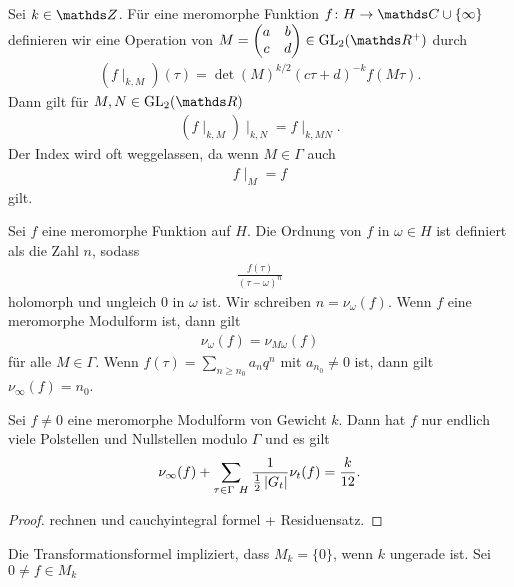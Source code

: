 \begin{defi}
Sei $k\in \Z$.
Für eine meromorphe Funktion $f \colon H \to \C \cup \{\infty\}$
definieren wir eine Operation von $M=\begin{pmatrix}
a&b\\
c&d
\end{pmatrix} \in \GL_2(\R^+)$
durch
\begin{align*}
(f\mid_{k,M})(\tau)=\det(M)^{k/2}(c\tau +d)^{-k} f(M\tau).
\end{align*}
Dann gilt für $M,N \in \GL_2(\R)$
\begin{align*}
(f\mid_{k,M})\mid_{k,N} =f \mid_{k,MN}.
\end{align*}
Der Index wird oft weggelassen, da wenn $M \in \Gamma$ auch
\begin{align*}
f\mid_M=f
\end{align*}
gilt.
\end{defi}

\begin{defi}
Sei $f$ eine meromorphe Funktion auf $H$.
Die Ordnung von $f$ in $\omega \in H$ ist definiert als die Zahl $n$, sodass
\begin{align*}
\frac{f(\tau)}{(\tau-\omega)^n}
\end{align*}
holomorph und ungleich $0$ in $\omega$ ist.
Wir schreiben $n=\nu_\omega(f)$.
Wenn $f$ eine meromorphe Modulform ist, dann gilt
\begin{align*}
\nu_\omega(f)=\nu_{M\omega}(f)
\end{align*}
für alle $M \in \Gamma$.
Wenn $f(\tau)=\sum_{n\geq n_0} a_nq^n$ mit $a_{n_0}\not =0$ ist, dann gilt $\nu_\infty(f)=n_0$.
\end{defi}

\begin{thm}
Sei $f\not =0$ eine meromorphe Modulform von Gewicht $k$.
Dann hat $f$ nur endlich viele Polstellen und Nullstellen modulo $\Gamma$ und es gilt
\begin{align*}
\nu_\infty(f)+\sum_{\tau \in \Gamma \ H} \frac{1}{\frac{1}{2}\left\vert G_t\right\vert} \nu_t(f)=\frac{k}{12}.
\end{align*}
\end{thm}
\begin{proof}
rechnen und cauchyintegral formel + Residuensatz.
\end{proof}

\begin{bem}
Die Transformationsformel impliziert, dass $M_k=\{0\}$, wenn $k$ ungerade ist.
Sei $0 \not =f \in M_k$
\end{bem}


